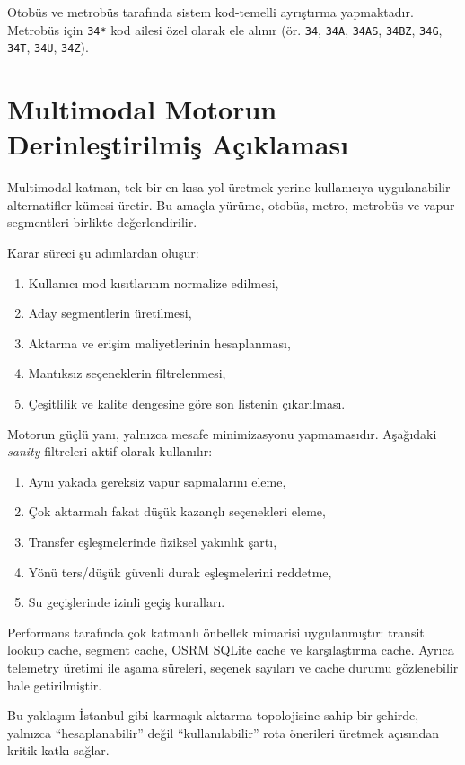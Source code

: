 Otobüs ve metrobüs tarafında sistem kod-temelli ayrıştırma yapmaktadır. Metrobüs için \texttt{34*} kod ailesi özel olarak ele alınır (ör. \texttt{34}, \texttt{34A}, \texttt{34AS}, \texttt{34BZ}, \texttt{34G}, \texttt{34T}, \texttt{34U}, \texttt{34Z}).

\section{Multimodal Motorun Derinleştirilmiş Açıklaması}

Multimodal katman, tek bir en kısa yol üretmek yerine kullanıcıya uygulanabilir alternatifler kümesi üretir. Bu amaçla yürüme, otobüs, metro, metrobüs ve vapur segmentleri birlikte değerlendirilir.

Karar süreci şu adımlardan oluşur:
\begin{enumerate}
    \item Kullanıcı mod kısıtlarının normalize edilmesi,
    \item Aday segmentlerin üretilmesi,
    \item Aktarma ve erişim maliyetlerinin hesaplanması,
    \item Mantıksız seçeneklerin filtrelenmesi,
    \item Çeşitlilik ve kalite dengesine göre son listenin çıkarılması.
\end{enumerate}

Motorun güçlü yanı, yalnızca mesafe minimizasyonu yapmamasıdır. Aşağıdaki \textit{sanity} filtreleri aktif olarak kullanılır:
\begin{enumerate}
    \item Aynı yakada gereksiz vapur sapmalarını eleme,
    \item Çok aktarmalı fakat düşük kazançlı seçenekleri eleme,
    \item Transfer eşleşmelerinde fiziksel yakınlık şartı,
    \item Yönü ters/düşük güvenli durak eşleşmelerini reddetme,
    \item Su geçişlerinde izinli geçiş kuralları.
\end{enumerate}

Performans tarafında çok katmanlı önbellek mimarisi uygulanmıştır: transit lookup cache, segment cache, OSRM SQLite cache ve karşılaştırma cache. Ayrıca telemetry üretimi ile aşama süreleri, seçenek sayıları ve cache durumu gözlenebilir hale getirilmiştir.

Bu yaklaşım İstanbul gibi karmaşık aktarma topolojisine sahip bir şehirde, yalnızca ``hesaplanabilir'' değil ``kullanılabilir'' rota önerileri üretmek açısından kritik katkı sağlar.

